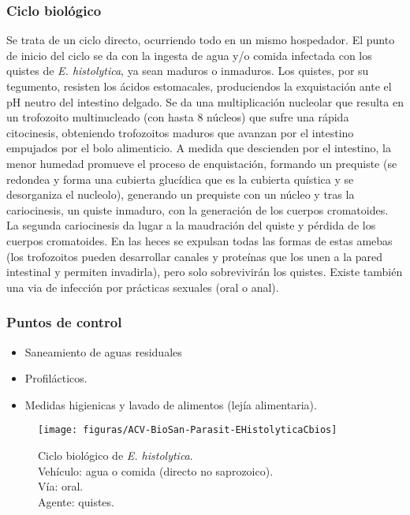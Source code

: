 \documentclass[10pt,a4paper,onecolumn,openany]{book}
\begin{document}
\begin{multicols}{2}
	\subsubsection{Ciclo biológico}
	Se trata de un ciclo directo, ocurriendo todo en un mismo hospedador. El punto de inicio del ciclo se da con la ingesta de agua y/o comida infectada con los quistes de \textit{E. histolytica}, ya sean maduros o inmaduros. Los quistes, por su tegumento, resisten los ácidos estomacales, produciendos la exquistación ante el pH neutro del intestino delgado. Se da una multiplicación nucleolar que resulta en un trofozoito multinucleado (con hasta 8 núcleos) que sufre una rápida citocinesis, obteniendo trofozoitos maduros que avanzan por el intestino empujados por el bolo alimenticio. A medida que descienden por el intestino, la menor humedad promueve el proceso de enquistación, formando un prequiste (se redondea y forma una cubierta glucídica que es la cubierta quística y se desorganiza el nucleolo), generando un prequiste con un núcleo y tras la cariocinesis, un quiste inmaduro, con la generación de los cuerpos cromatoides. La segunda cariocinesis da lugar a la maudración del quiste y pérdida de los cuerpos cromatoides. En las heces se expulsan todas las formas de estas amebas (los trofozoitos pueden desarrollar canales y proteínas que los unen a la pared intestinal y permiten invadirla), pero solo sobrevivirán los quistes. Existe también una via de infección por prácticas sexuales (oral o anal).
	\subsubsection{Puntos de control}
	\begin{itemize}[itemsep=0pt,parsep=0pt,topsep=0pt,partopsep=0pt]
		\item Saneamiento de aguas residuales
		\item Profilácticos.
		\item Medidas higienicas y lavado de alimentos (lejía alimentaria).
	\end{itemize}
	\columnbreak
	\begin{figure}[H]
		\centering
		\texttt{[image: figuras/ACV-BioSan-Parasit-EHistolyticaCbios]}
		\caption{Ciclo biológico de \textit{E. histolytica}.\\Vehículo: agua o comida (directo no saprozoico).\\Vía: oral.\\Agente: quistes. \label{fig:PARASIT:EHistolyticaCBios}}
	\end{figure}
\end{multicols}
\end{document}
